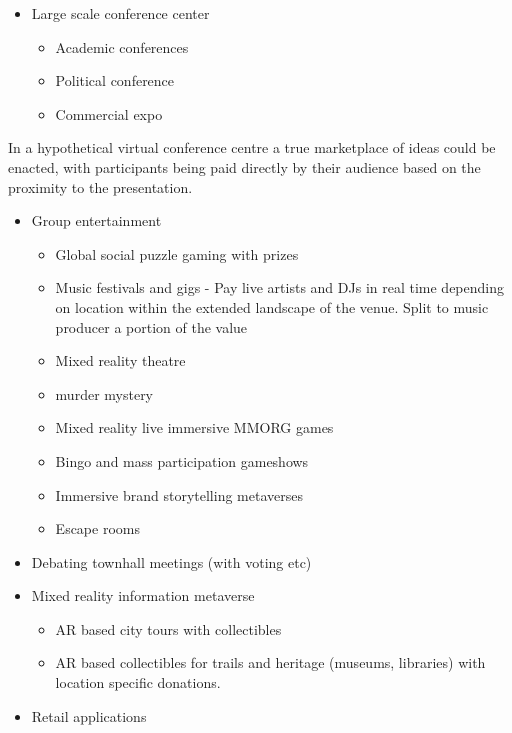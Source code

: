 \documentclass[
	12pt, %
	fleqn, %
	a4paper, %
	oneside, %
]{LegrandOrangeBook}
\begin{document}
\begin{itemize}
\item
  Large scale conference center

  \begin{itemize}
  \item
    Academic conferences
  \item
    Political conference
  \item
    Commercial expo
  \end{itemize}
\end{itemize}

In a hypothetical virtual conference centre a true marketplace of ideas
could be enacted, with participants being paid directly by their
audience based on the proximity to the presentation.

\begin{itemize}
\item
  Group entertainment

  \begin{itemize}
  \item Global social puzzle gaming with prizes
  \item
    Music festivals and gigs - Pay live artists and DJs in real time
    depending on location within the extended landscape of the venue.
    Split to music producer a portion of the value
  \item
    Mixed reality theatre
  \item
    murder mystery
  \item
    Mixed reality live immersive MMORG games
  \item
    Bingo and mass participation gameshows
  \item
    Immersive brand storytelling metaverses
  \item
    Escape rooms
  \end{itemize}
\item
  Debating townhall meetings (with voting etc)
\item
  Mixed reality information metaverse

  \begin{itemize}
  \item
    AR based city tours with collectibles
  \item
    AR based collectibles for trails and heritage (museums, libraries)
    with location specific donations.
  \end{itemize}
\item
  Retail applications


\end{itemize}
\end{document}
